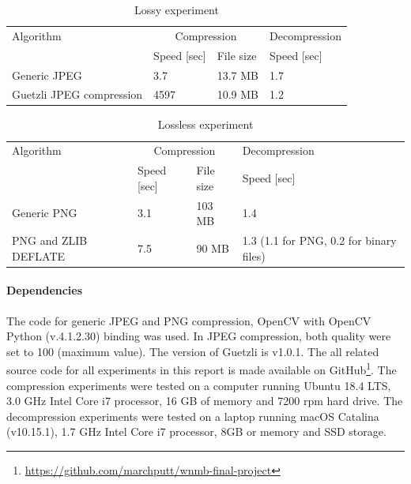 \documentclass{article}
\begin{document}
\begin{table}
    \caption{Lossy experiment}
    \centering
    \begin{tabular}{llll}
        \toprule
        Algorithm                & \multicolumn{2}{c}{Compression}  & Decompression     \\
                                 & Speed {[}sec{]} & File size      & Speed {[}sec{]}   \\
        \midrule
        Generic JPEG             &  3.7            &  13.7 MB       & 1.7               \\
        Guetzli JPEG compression &  4597           &  10.9 MB       & 1.2               \\
        \bottomrule
    \end{tabular}
    \label{tab:lossy}
\end{table}

\begin{table}[t]
 \caption{Lossless experiment}
  \centering
    \begin{tabular}{llll}
        \toprule
        Algorithm                & \multicolumn{2}{c}{Compression}  & Decompression     \\
                                 & Speed {[}sec{]} & File size      & Speed {[}sec{]}   \\
        \midrule
        Generic PNG             &  3.1            &  103 MB        & 1.4               \\
        PNG and ZLIB DEFLATE    &  7.5            &  90 MB         & 1.3 (1.1 for PNG, 0.2 for binary files) \\
        \bottomrule
    \end{tabular}
  \label{tab:losless}
\end{table}

\paragraph{Dependencies} The code for generic JPEG and PNG compression, OpenCV with OpenCV Python (v.4.1.2.30) binding was used. In JPEG compression, both quality were set to 100 (maximum value). The version of Guetzli is v1.0.1. The all related source code for all experiments in this report is made available on GitHub\footnote{\url{https://github.com/marchputt/wnmb-final-project}}. The compression experiments were tested on a computer running Ubuntu 18.4 LTS, 3.0 GHz Intel Core i7 processor, 16 GB of memory and 7200 rpm hard drive. The decompression experiments were tested on a laptop running macOS Catalina (v10.15.1), 1.7 GHz Intel Core i7 processor, 8GB or memory and SSD storage. 
\end{document}
